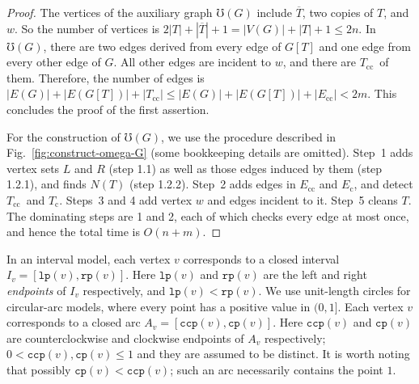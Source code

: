 \documentclass[10pt]{article}
\newcommand{\ce}[1]{\ensuremath{{\mathtt{cp}(#1)}}}
\newcommand{\cce}[1]{\ensuremath{{\mathtt{ccp}(#1)}}}
\newcommand{\lp}[1]{\ensuremath{{\mathtt{lp}(#1)}}}
\newcommand{\rp}[1]{\ensuremath{{\mathtt{rp}(#1)}}}
\newcommand{\ec}{\ensuremath{E_{\text{c}}}}
\newcommand{\ecc}{\ensuremath{E_{\text{cc}}}}
\newcommand{\oc}{\ensuremath{T_{\text{c}}}}
\newcommand{\oo}{\ensuremath{T}}
\newcommand{\occ}{\ensuremath{T_{\text{cc}}}}
\begin{document}
\begin{proof}
  The vertices of the auxiliary graph $\mho(G)$ include
  $\overline{\oo}$, two copies of $\oo$, and $w$.  So the number of
  vertices is $2|\oo| + |\overline{\oo}| + 1 = |V(G)| + |\oo| + 1 \le
  2 n$.  In $\mho(G)$, there are two edges derived from every edge of
  $G[\oo]$ and one edge from every other edge of $G$.  All other edges
  are incident to $w$, and there are \occ\ of them.  Therefore, the
  number of edges is $|E(G)| + |E(G[\oo])| + |\occ| \le |E(G)| +
  |E(G[\oo])| + |\ecc| < 2 m$.  This concludes the proof of the first
  assertion.

  For the construction of $\mho(G)$, we use the procedure described in
  Fig.~\ref{fig:construct-omega-G} (some bookkeeping details are
  omitted).  Step~1 adds vertex sets $L$ and $R$ (step 1.1) as well as
  those edges induced by them (step 1.2.1), and finds $N(\oo)$ (step
  1.2.2).  Step~2 adds edges in $\ecc$ and $\ec$, and detect \occ\ and
  \oc.  Steps~3 and 4 add vertex $w$ and edges incident to it.  Step~5
  cleans $\oo$.  The dominating steps are 1 and 2, each of which
  checks every edge at most once, and hence the total time is $O(n +
  m)$.
\end{proof}

In an interval model, each vertex $v$ corresponds to a closed interval
$I_v = [\lp{v}, \rp{v}]$.  Here \lp{v} and \rp{v} are the left and
right \emph{endpoints} of $I_v$ respectively, and $\lp{v}< \rp{v}$.
We use unit-length circles for circular-arc models, where every point
has a positive value in $(0,1]$.  Each vertex $v$ corresponds to a
closed arc $A_v = [\cce{v}, \ce{v}]$.  Here \cce{v} and \ce{v} are
counterclockwise and clockwise endpoints of $A_v$ respectively; $0<
\cce{v}, \ce{v}\le 1$ and they are assumed to be distinct.  It is
worth noting that possibly $\ce{v}<\cce{v}$; such an arc necessarily
contains the point $1$.
\end{document}
